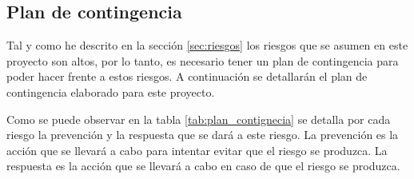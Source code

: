 \subsection{Plan de contingencia}
\label{subsec:planContingencia}


Tal y como he descrito en la sección \ref{sec:riesgos} los riesgos que se asumen en este
proyecto son altos, por lo tanto, es necesario tener un plan de contingencia para poder
hacer frente a estos riesgos. A continuación se detallarán el plan de contingencia elaborado
para este proyecto.

Como se puede observar en la tabla \ref{tab:plan_contignecia} se detalla por cada riesgo
la prevención y la respuesta que se dará a este riesgo. La prevención es la acción que se
llevará a cabo para intentar evitar que el riesgo se produzca. La respuesta es la acción
que se llevará a cabo en caso de que el riesgo se produzca.

